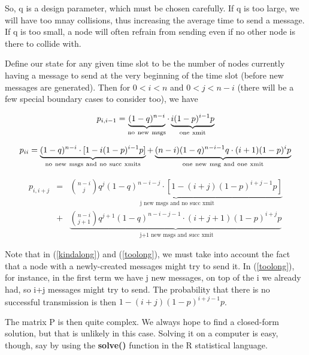 So, q is a design parameter, which must be chosen carefully.  If q is
too large, we will have too mnay collisions, thus increasing the average
time to send a message.  If q is too small, a node will often refrain
from sending even if no other node is there to collide with.

Define our state for any given time slot to be the number of nodes currently
having a message to send at the very beginning of the time slot (before new
messages are generated). Then for $0 < i < n$ and $0 < j < n-i$ (there
will be a few special boundary cases to consider too), we have

\begin{equation}
p_{i,i-1} = \underbrace{(1-q)^{n-i}}_{\rm no~new~msgs}
\cdot
\underbrace{i(1-p)^{i-1}p}_{\rm one~xmit}
\end{equation}

\begin{equation}
\label{kindalong} 
p_{ii} =
\underbrace{(1-q)^{n-i} \cdot [1-i(1-p)^{i-1}p]}_{\rm no~new~msgs~and~no~succ~xmits} +
\underbrace{(n-i)(1-q)^{n-i-1}q \cdot (i+1)(1-p)^ip}_{\rm one~new~msg~and~one~xmit}
\end{equation}

\begin{eqnarray}
p_{i,i+j} &=& 
\underbrace{
\binom{n-i}{j} q^{j}(1-q)^{n-i-j}
\cdot [1-(i+j)(1-p)^{i+j-1}p]}
_\textrm{ j new msgs and no succ xmit} \nonumber \\
&+& \underbrace{
\binom{n-i}{j+1}
q^{j+1}(1-q)^{n-i-j-1}
\cdot (i+j+1)(1-p)^{i+j}p}_
\textrm{ j+1 new msgs and 
succ xmit} \label{toolong}
\end{eqnarray}

% 

Note that in (\ref{kindalong}) and (\ref{toolong}), we must take into
account the fact that a node with a newly-created messages might try to
send it.  In (\ref{toolong}), for instance, in the first term we have j
new messages, on top of the i we already had, so i+j messages might try
to send.  The probability that there is no successful transmission is
then $1-(i+j)(1-p)^{i+j-1}p$.

The matrix P is then quite complex.  We always hope to find a
closed-form solution, but that is unlikely in this case.  Solving it on
a computer is easy, though, say by using the {\bf solve()} function in
the R statistical language.

